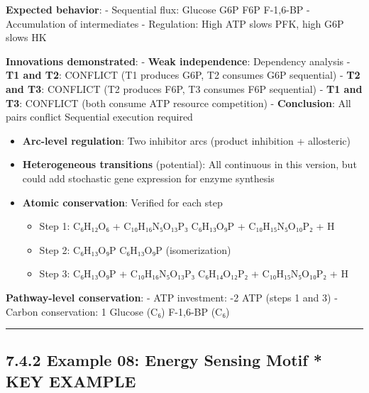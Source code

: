 \textbf{Expected behavior}: - Sequential flux: Glucose \textrightarrow G6P \textrightarrow F6P \textrightarrow
F-1,6-BP - Accumulation of intermediates - Regulation: High ATP slows
PFK, high G6P slows HK

\textbf{Innovations demonstrated}: - \checkmark \textbf{Weak independence}:
Dependency analysis - \textbf{T1 and T2}: CONFLICT (T1 produces G6P, T2
consumes G6P \textrightarrow sequential) - \textbf{T2 and T3}: CONFLICT (T2 produces
F6P, T3 consumes F6P \textrightarrow sequential) - \textbf{T1 and T3}: CONFLICT (both
consume ATP \textrightarrow resource competition) - \textbf{Conclusion}: All pairs
conflict \textrightarrow Sequential execution required

\begin{itemize}
\item
  \checkmark \textbf{Arc-level regulation}: Two inhibitor arcs (product
  inhibition + allosteric)
\item
  \checkmark \textbf{Heterogeneous transitions} (potential): All continuous in
  this version, but could add stochastic gene expression for enzyme
  synthesis
\item
  \checkmark \textbf{Atomic conservation}: Verified for each step

  \begin{itemize}
  \tightlist
  \item
    Step 1: C₆H₁₂O₆ + C₁₀H₁₆N₅O₁₃P₃ \textrightarrow C₆H₁₃O₉P + C₁₀H₁₅N₅O₁₀P₂ + H \checkmark
  \item
    Step 2: C₆H₁₃O₉P \textrightarrow C₆H₁₃O₉P \checkmark (isomerization)
  \item
    Step 3: C₆H₁₃O₉P + C₁₀H₁₆N₅O₁₃P₃ \textrightarrow C₆H₁₄O₁₂P₂ + C₁₀H₁₅N₅O₁₀P₂ + H \checkmark
  \end{itemize}
\end{itemize}

\textbf{Pathway-level conservation}: - ATP investment: -2 ATP (steps 1
and 3) - Carbon conservation: 1 Glucose (C₆)  F-1,6-BP (C₆) \checkmark

\begin{center}\rule{0.5\linewidth}{0.5pt}\end{center}

\hypertarget{example-08-energy-sensing-motif-key-example}{%
\subsection{\texorpdfstring{7.4.2 Example 08: Energy Sensing Motif *
\textbf{KEY
EXAMPLE}}{7.4.2 Example 08: Energy Sensing Motif * KEY EXAMPLE}}\label{example-08-energy-sensing-motif-key-example}}

